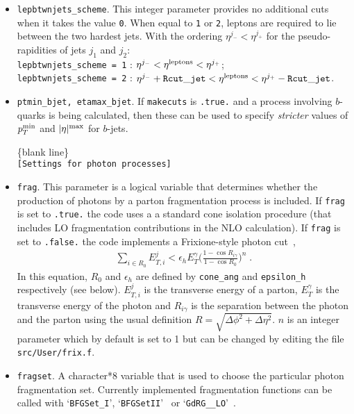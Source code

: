\documentclass[12pt]{article}
\begin{document}
\begin{itemize}
\item {\tt lepbtwnjets\_scheme}. This integer parameter provides no
additional cuts when it takes the value {\tt 0}. When equal to
{\tt 1} or {\tt 2}, leptons are required to lie between the two
hardest jets. With the ordering $\eta^{j_-} < \eta^{j_+}$ for the
pseudo-rapidities of jets $j_1$ and $j_2$: \\
{\tt lepbtwnjets\_scheme = 1} : 
 $\eta^{j_-} < \eta^{\rm leptons} < \eta^{j_+}$; \\
{\tt lepbtwnjets\_scheme = 2} :
 $\eta^{j_-}+{\tt Rcut\_jet} < \eta^{\rm leptons} < \eta^{j_+}-{\tt Rcut\_jet}$.

\item {\tt ptmin\_bjet,  etamax\_bjet}. If {\tt makecuts} is {\tt .true.}
and a process involving $b$-quarks is being calculated, then these can
be used to specify {\em stricter} values of $p_T^{\rm min}$
and $|\eta|^{\rm max}$ for $b$-jets.

\begin{center}
\{blank line\} \\
{\tt [Settings for photon processes] }
\end{center}
\item {\tt frag}. This parameter is a logical variable that determines whether the production of photons by a parton 
fragmentation process is included. If {\tt frag} is set to {\tt .true.} the code uses a a standard cone isolation
procedure (that includes LO fragmentation contributions in the NLO calculation).
If {\tt frag} is set to {\tt .false.} the code implements
a Frixione-style photon cut~\cite{Frixione:1998jh},
\begin{eqnarray}
\sum_{i \in R_0} E_{T,i}^j  < \epsilon_h E_{T}^{\gamma} \bigg(\frac{1-\cos{R_{i\gamma}}}{1-\cos{R_0}}\bigg)^{n} \;.
\label{frixeq}
\end{eqnarray}
In this equation, $R_0$ and $\epsilon_h$ are defined by {\tt cone\_ang} and {\tt epsilon\_h} respectively (see below).
$E_{T,i}^{j}$ is the transverse energy of a parton, $E_{T}^\gamma$ is the
transverse energy of the photon and $R_{i\gamma}$ is the separation between the photon and the parton using the usual definition 
$R=\sqrt{\Delta\phi^2+\Delta\eta^2}$. $n$ is an integer parameter which by default is set to 1 but can be changed by editing the 
file {\tt src/User/frix.f}. 

\item {\tt fragset}. A character*8 variable that is used to choose the particular photon fragmentation set.
Currently implemented fragmentation functions can be called with `{\tt BFGSet\_I}', `{\tt BFGSetII}'~\cite{Bourhis:1997yu}
or `{\tt GdRG\_\_LO}'~\cite{GehrmannDeRidder:1998ba}.  


\end{itemize}
\end{document}
